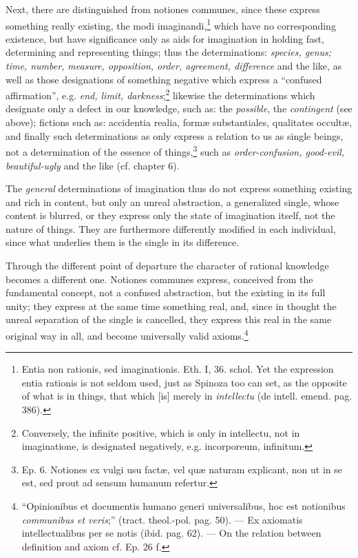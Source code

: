\documentclass[12pt,a4paper,openany]{book}
\newcommand{\opage}[1]{\marginnote{\footnotesize\textit{[#1]}}}
\begin{document}
Next, there are distinguished from notiones communes, since these express something
really existing, the modi imaginandi,\footnote{Entia non rationis,
sed imaginationis. Eth. I, 36. schol. Yet the expression entia rationis
is not seldom used, just as Spinoza too can set, as the opposite of
what is in things, that which [is] merely in \emph{intellectu}
(de intell. emend. pag. 386).} which have no corresponding existence,
but have significance only as aids for imagination in
holding fast, determining and representing things; thus the determinations:
\emph{species, genus; time, number, measure, opposition, order, agreement,
difference} and the like, as well as those designations of something negative which express
a ``confused affirmation'', e.g. \emph{end, limit,
darkness};\footnote{Conversely, the infinite positive, which is only in
intellectu, not in imaginatione, is designated negatively, e.g.
incorporeum, infinitum.} likewise the determinations which designate only
a defect in our knowledge, such as: the \emph{possible}, the \emph{contingent} (see
above); fictions such as: accidentia realia, formæ substantiales,
qualitates occultæ, and finally such determinations as only
express a relation to us as single beings, not a determination of
the essence of things,\footnote{Ep. 6. Notiones ex vulgi usu factæ, vel quæ
naturam explicant, non ut in se est, sed prout ad sensum humanum
refertur.} such as \emph{order-confusion, good-evil, beautiful-ugly} and the like
(cf. chapter 6).

The \emph{general} determinations of imagination thus do not express something
existing and rich in content, but only an unreal abstraction, a
generalized single, whose content is blurred, or they express only
the state of imagination itself, not the nature of things. They are furthermore
differently modified in each individual, since what underlies them
is the single in its difference.

Through the different point of departure the character of rational knowledge
becomes a different one. Notiones communes express,
\opage{100}\setcounter{footnote}{0}conceived from the fundamental concept, not a confused abstraction, but
the existing in its full unity; they express at the same time something real,
and, since in thought the unreal separation of the single is cancelled,
they express this real in the same original way in all, and
become universally valid axioms.\footnote{``Opinionibus et documentis
humano generi universalibus, hoc est notionibus \emph{communibus et
veris};'' (tract. theol.-pol. pag. 50). --- Ex axiomatis
intellectualibus per se notis (ibid. pag. 62). --- On the relation
between definition and axiom cf. Ep. 26 f.}
\end{document}
